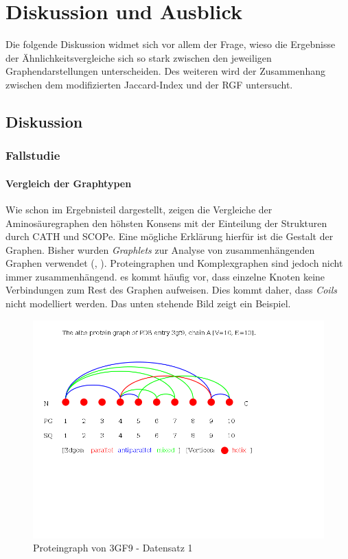 \documentclass{report}
\begin{document}
\chapter{Diskussion und Ausblick}




Die folgende Diskussion widmet sich vor allem der Frage, wieso die Ergebnisse der \"Ahnlichkeitsvergleiche sich so stark zwischen den jeweiligen Graphendarstellungen unterscheiden.
Des weiteren wird der Zusammenhang zwischen dem modifizierten Jaccard-Index und der RGF untersucht.

\section{Diskussion}

\subsection{Fallstudie}
\subsubsection{Vergleich der Graphtypen}

Wie schon im Ergebnisteil dargestellt, zeigen die Vergleiche der Aminos\"auregraphen den h\"ohsten Konsens mit der Einteilung der Strukturen durch CATH und SCOPe. Eine m\"ogliche Erkl\"arung hierf\"ur ist die Gestalt der Graphen. Bisher wurden \textit{Graphlets} zur Analyse von zusammenh\"angenden Graphen verwendet (\cite{sherv_graphlets}, \cite{graphletfrequency}).
Proteingraphen und Komplexgraphen sind jedoch nicht immer zusammenh\"angend. es kommt h\"aufig vor, dass einzelne Knoten keine Verbindungen zum Rest des Graphen aufweisen. Dies kommt daher, dass \textit{Coils} nicht modelliert werden. Das unten stehende Bild zeigt ein Beispiel.

\begin{figure}[h!]
\includegraphics[scale=0.5]{3gf9_A_albe_PG.png}
\caption{Proteingraph von 3GF9 - Datensatz 1}
\end{figure}
\end{document}
